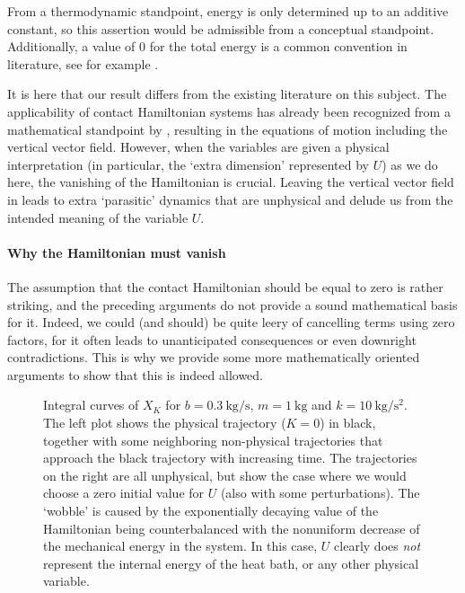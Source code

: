 From a thermodynamic standpoint, energy is only determined up to an additive constant, so this assertion would be admissible from a conceptual standpoint. Additionally, a value of 0 for the total energy is a common convention in literature, see for example \citet{Fermi1936}.

It is here that our result differs from the existing literature on this subject. The applicability of contact Hamiltonian systems has already been recognized from a mathematical standpoint by \citet{Bravetti2017}, resulting in the equations of motion including the vertical vector field. However, when the variables are given a physical interpretation (in particular, the `extra dimension' represented by $U$) as we do here, the vanishing of the Hamiltonian is crucial.
Leaving the vertical vector field in leads to extra `parasitic' dynamics that are unphysical and delude us from the intended meaning of the variable $U$.

\paragraph{Why the Hamiltonian must vanish} The assumption that the contact Hamiltonian should be equal to zero is rather striking, and the preceding arguments do not provide a sound mathematical basis for it. Indeed, we could (and should) be quite leery of cancelling terms using zero factors, for it often leads to unanticipated consequences or even downright contradictions. This is why we provide some more mathematically oriented arguments to show that this is indeed allowed.

\begin{figure}[ht!]
    \centering
    
    \caption{Integral curves of $X_K$ for $b = \SI{0.3}{\kilogram \per \second}$, $ m = \SI{1}{\kilogram}$ and  $k = \SI{10}{\kilogram \per \second \squared}$. The left plot shows the physical trajectory ($K = 0$) in black, together with some neighboring non-physical trajectories that approach the black trajectory with increasing time. The trajectories on the right are all unphysical, but show the case where we would choose a zero initial value for $U$ (also with some perturbations). The `wobble' is caused by the exponentially decaying value of the Hamiltonian being counterbalanced with the nonuniform decrease of the mechanical energy in the system. In this case, $U$ clearly does \emph{not} represent the internal energy of the heat bath, or any other physical variable.}
    \label{fig:dho_trajectories}
\end{figure}

